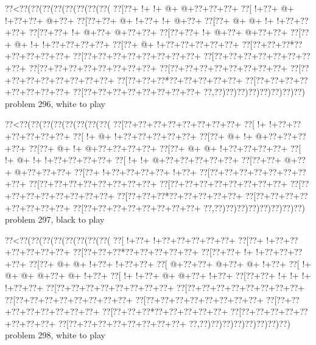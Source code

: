 \vbox{\vbox{\goo
\0??<\0??(\0??(\0??(\0??(\0??(\0??(\0??(\0??(
\0??[\0??+\- !+\- !+\- @+\- @+\0??+\0??+\0??+
\0??[\- !+\0??+\- @+\- !+\0??+\0??+\- @+\0??+
\0??[\0??+\0??+\- @+\- !+\0??+\- !+\- @+\0??+
\0??[\0??+\- @+\- @+\- !+\- !+\0??+\0??+\0??+
\0??[\0??+\0??+\- !+\- @+\0??+\- @+\0??+\0??+
\0??[\0??+\0??+\- !+\- @+\0??+\- @+\0??+\0??+
\0??[\0??+\- @+\- !+\- !+\0??+\0??+\0??+\0??+
\0??[\0??+\- @+\- !+\0??+\0??+\0??+\0??+\0??+
\0??[\0??+\0??+\0??*\0??+\0??+\0??+\0??+\0??+
\0??[\0??+\0??+\0??+\0??+\0??+\0??+\0??+\0??+
\0??[\0??+\0??+\0??+\0??+\0??+\0??+\0??+\0??+
\0??[\0??+\0??+\0??+\0??+\0??+\0??+\0??+\0??+
\0??[\0??+\0??+\0??+\0??+\0??+\0??+\0??+\0??+
\0??[\0??+\0??+\0??+\0??+\0??+\0??+\0??+\0??+
\0??[\0??+\0??+\0??*\0??+\0??+\0??+\0??+\0??+
\0??[\0??+\0??+\0??+\0??+\0??+\0??+\0??+\0??+
\0??[\0??+\0??+\0??+\0??+\0??+\0??+\0??+\0??+
\0??,\0??)\0??)\0??)\0??)\0??)\0??)\0??)\0??)
}
\hfil problem 296, white to play\hfil\break
}

\vbox{\vbox{\goo
\0??<\0??(\0??(\0??(\0??(\0??(\0??(\0??(\0??(
\0??[\0??+\0??+\0??+\0??+\0??+\0??+\0??+\0??+
\0??[\- !+\- !+\0??+\0??+\0??+\0??+\0??+\0??+
\0??[\- !+\- @+\- !+\0??+\0??+\0??+\0??+\0??+
\0??[\0??+\- @+\- !+\- @+\0??+\0??+\0??+\0??+
\0??[\0??+\- @+\- !+\- @+\0??+\0??+\0??+\0??+
\0??[\0??+\- @+\- @+\- !+\0??+\0??+\0??+\0??+
\0??[\- !+\- @+\- !+\- !+\0??+\0??+\0??+\0??+
\0??[\- !+\- !+\- @+\0??+\0??+\0??+\0??+\0??+
\0??[\0??+\0??+\- @+\0??+\- @+\0??+\0??+\0??+
\0??[\0??+\- !+\0??+\0??+\0??+\0??+\- !+\0??+
\0??[\0??+\0??+\0??+\0??+\0??+\0??+\0??+\0??+
\0??[\0??+\0??+\0??+\0??+\0??+\0??+\0??+\0??+
\0??[\0??+\0??+\0??+\0??+\0??+\0??+\0??+\0??+
\0??[\0??+\0??+\0??+\0??+\0??+\0??+\0??+\0??+
\0??[\0??+\0??+\0??*\0??+\0??+\0??+\0??+\0??+
\0??[\0??+\0??+\0??+\0??+\0??+\0??+\0??+\0??+
\0??[\0??+\0??+\0??+\0??+\0??+\0??+\0??+\0??+
\0??,\0??)\0??)\0??)\0??)\0??)\0??)\0??)\0??)
}
\hfil problem 297, black to play\hfil\break
}

\vbox{\vbox{\goo
\0??<\0??(\0??(\0??(\0??(\0??(\0??(\0??(\0??(
\0??[\- !+\0??+\- !+\0??+\0??+\0??+\0??+\0??+
\0??[\0??+\- !+\0??+\0??+\0??+\0??+\0??+\0??+
\0??[\0??+\0??+\0??*\0??+\0??+\0??+\0??+\0??+
\0??[\0??+\0??+\- !+\- !+\0??+\0??+\0??+\0??+
\0??[\0??+\- @+\- @+\- !+\0??+\- !+\0??+\0??+
\0??[\- @+\0??+\0??+\- @+\0??+\- @+\- !+\0??+
\0??[\- !+\- @+\- @+\- @+\0??+\- @+\- !+\0??+
\0??[\- !+\- !+\0??+\- @+\- @+\0??+\- !+\0??+
\0??[\0??+\0??+\- !+\- !+\- !+\- !+\0??+\0??+
\0??[\0??+\0??+\0??+\0??+\0??+\0??+\0??+\0??+
\0??[\0??+\0??+\0??+\0??+\0??+\0??+\0??+\0??+
\0??[\0??+\0??+\0??+\0??+\0??+\0??+\0??+\0??+
\0??[\0??+\0??+\0??+\0??+\0??+\0??+\0??+\0??+
\0??[\0??+\0??+\0??+\0??+\0??+\0??+\0??+\0??+
\0??[\0??+\0??+\0??*\0??+\0??+\0??+\0??+\0??+
\0??[\0??+\0??+\0??+\0??+\0??+\0??+\0??+\0??+
\0??[\0??+\0??+\0??+\0??+\0??+\0??+\0??+\0??+
\0??,\0??)\0??)\0??)\0??)\0??)\0??)\0??)\0??)
}
\hfil problem 298, white to play\hfil\break
}

